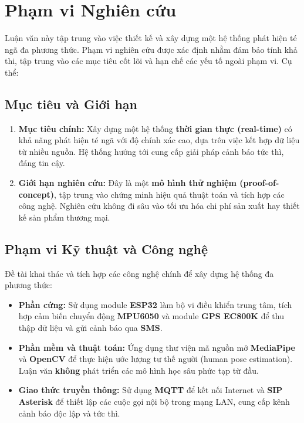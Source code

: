 
\section{Phạm vi Nghiên cứu}

Luận văn này tập trung vào việc thiết kế và xây dựng một hệ thống phát hiện té ngã đa phương thức. Phạm vi nghiên cứu được xác định nhằm đảm bảo tính khả thi, tập trung vào các mục tiêu cốt lõi và hạn chế các yếu tố ngoài phạm vi. Cụ thể:

\subsection{Mục tiêu và Giới hạn}
\begin{enumerate}
    \item \textbf{Mục tiêu chính:} Xây dựng một hệ thống \textbf{thời gian thực (real-time)} có khả năng phát hiện té ngã với độ chính xác cao, dựa trên việc kết hợp dữ liệu từ nhiều nguồn. Hệ thống hướng tới cung cấp giải pháp cảnh báo tức thì, đáng tin cậy.
    
    \item \textbf{Giới hạn nghiên cứu:} Đây là một \textbf{mô hình thử nghiệm (proof-of-concept)}, tập trung vào chứng minh hiệu quả thuật toán và tích hợp các công nghệ. Nghiên cứu không đi sâu vào tối ưu hóa chi phí sản xuất hay thiết kế sản phẩm thương mại.
\end{enumerate}

\subsection{Phạm vi Kỹ thuật và Công nghệ}
Đề tài khai thác và tích hợp các công nghệ chính để xây dựng hệ thống đa phương thức:
\begin{itemize}
    \item \textbf{Phần cứng:} Sử dụng module \textbf{ESP32} làm bộ vi điều khiển trung tâm, tích hợp cảm biến chuyển động \textbf{MPU6050} và module \textbf{GPS EC800K} để thu thập dữ liệu và gửi cảnh báo qua \textbf{SMS}.
    
    \item \textbf{Phần mềm và thuật toán:} Ứng dụng thư viện mã nguồn mở \textbf{MediaPipe} và \textbf{OpenCV} để thực hiện ước lượng tư thế người (human pose estimation). Luận văn \textbf{không} phát triển các mô hình học sâu phức tạp từ đầu.
    
    \item \textbf{Giao thức truyền thông:} Sử dụng \textbf{MQTT} để kết nối Internet và \textbf{SIP Asterisk} để thiết lập các cuộc gọi nội bộ trong mạng LAN, cung cấp kênh cảnh báo độc lập và tức thì.
\end{itemize}

